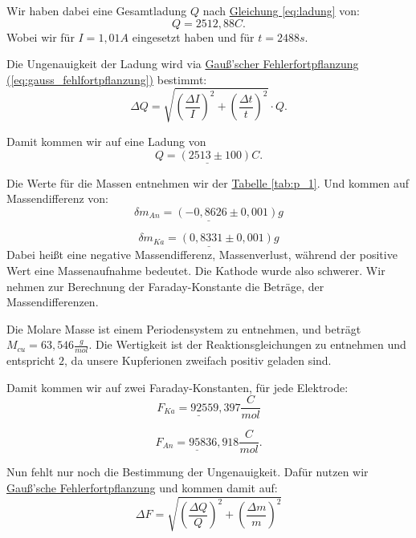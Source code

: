 Wir haben dabei eine Gesamtladung $Q$ nach \hyperref[eq:ladung]{Gleichung \ref*{eq:ladung}} von:
\begin{equation}
    Q = 2512,88 C.
\end{equation}
Wobei wir für $I = 1,01A$ eingesetzt haben und für $t = 2488s$.

Die Ungenauigkeit der Ladung wird via \hyperref[eq:gauss_fehlfortpflanzung]{Gauß'scher Fehlerfortpflanzung (\ref*{eq:gauss_fehlfortpflanzung})} bestimmt:
\begin{equation}
    \Delta Q = \sqrt{\left( \frac{\Delta I}{I} \right)^2 + \left( \frac{\Delta t}{t} \right)^2} \cdot Q.
    \label{eq:f_q}
\end{equation}

Damit kommen wir auf eine Ladung von 
\begin{equation}
    \underline{Q = (2513 \pm 100)C}.
\end{equation}

Die Werte für die Massen entnehmen wir der \hyperref[tab:p_1]{Tabelle \ref*{tab:p_1}}. Und kommen auf Massendifferenz von:
\begin{equation}
    \underline{
        \delta m_{An} = (-0,8626 \pm 0,001) g
    }
\end{equation}

\begin{equation}
    \underline{
        \delta m_{Ka} = (0,8331 \pm 0,001) g
    }
\end{equation}
Dabei heißt eine negative Massendifferenz, Massenverlust, während der positive Wert eine Massenaufnahme bedeutet. Die Kathode wurde also schwerer. Wir nehmen zur Berechnung der Faraday-Konstante die Beträge, der Massendifferenzen.

Die Molare Masse ist einem Periodensystem \cite{CuMol} zu entnehmen, und beträgt $M_{cu} = 63,546 \frac{g}{mol}$. Die Wertigkeit ist der Reaktionsgleichungen zu entnehmen und entspricht $2$, da unsere Kupferionen zweifach positiv geladen sind.

Damit kommen wir auf zwei Faraday-Konstanten, für jede Elektrode:
\begin{equation}
    \underline{F_{Ka} = 92559,397} \frac{C}{mol}
\end{equation}

\begin{equation}
    \underline{F_{An} = 95836,918} \frac{C}{mol}.
\end{equation}

Nun fehlt nur noch die Bestimmung der Ungenauigkeit. Dafür nutzen wir \hyperref[eq:gauss_fehlfortpflanzung]{Gauß'sche Fehlerfortpflanzung} und kommen damit auf:
\begin{equation}
    \Delta F = \sqrt{\left(\frac{\Delta Q}{Q}\right)^2 + \left(\frac{\Delta m}{m}\right)^2}
\end{equation}

